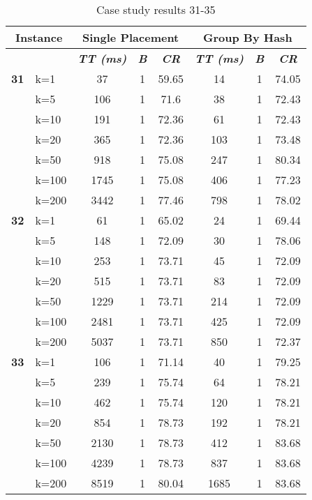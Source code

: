     \begin{table}[htbp]
    \caption{Case study results 31-35}
    \centering
    \begin{tabular}{|l|l|c|c|c|c|c|c|}
    \hline
    \multicolumn{ 2}{|c|}{\textbf{Instance}} & \multicolumn{ 3}{c|}{\textbf{Single Placement}} & \multicolumn{ 3}{c|}{\textbf{Group By Hash}} \\ \hline
    \multicolumn{ 2}{|l|}{} & \textbf{\textit{TT (ms)}} & \textbf{\textit{B}} & \textbf{\textit{CR}} & \textbf{\textit{TT (ms)}} & \textbf{\textit{B}} & \textbf{\textit{CR}} \\ \hline
    \multicolumn{1}{|r|}{\textbf{31}} & k=1 & 37 & 1 & 59.65 & 14 & 1 & 74.05 \\ 
     & k=5 & 106 & 1 & 71.6 & 38 & 1 & 72.43 \\ 
     & k=10 & 191 & 1 & 72.36 & 61 & 1 & 72.43 \\ 
     & k=20 & 365 & 1 & 72.36 & 103 & 1 & 73.48 \\ 
     & k=50 & 918 & 1 & 75.08 & 247 & 1 & 80.34 \\ 
     & k=100 & 1745 & 1 & 75.08 & 406 & 1 & 77.23 \\ 
     & k=200 & 3442 & 1 & 77.46 & 798 & 1 & 78.02 \\ \hline
    \multicolumn{1}{|r|}{\textbf{32}} & k=1 & 61 & 1 & 65.02 & 24 & 1 & 69.44 \\ 
     & k=5 & 148 & 1 & 72.09 & 30 & 1 & 78.06 \\ 
     & k=10 & 253 & 1 & 73.71 & 45 & 1 & 72.09 \\ 
     & k=20 & 515 & 1 & 73.71 & 83 & 1 & 72.09 \\ 
     & k=50 & 1229 & 1 & 73.71 & 214 & 1 & 72.09 \\ 
     & k=100 & 2481 & 1 & 73.71 & 425 & 1 & 72.09 \\ 
     & k=200 & 5037 & 1 & 73.71 & 850 & 1 & 72.37 \\ \hline
    \multicolumn{1}{|r|}{\textbf{33}} & k=1 & 106 & 1 & 71.14 & 40 & 1 & 79.25 \\ 
     & k=5 & 239 & 1 & 75.74 & 64 & 1 & 78.21 \\ 
     & k=10 & 462 & 1 & 75.74 & 120 & 1 & 78.21 \\ 
     & k=20 & 854 & 1 & 78.73 & 192 & 1 & 78.21 \\ 
     & k=50 & 2130 & 1 & 78.73 & 412 & 1 & 83.68 \\ 
     & k=100 & 4239 & 1 & 78.73 & 837 & 1 & 83.68 \\ 
     & k=200 & 8519 & 1 & 80.04 & 1685 & 1 & 83.68 \\ \hline

\end{tabular}
\end{table}
